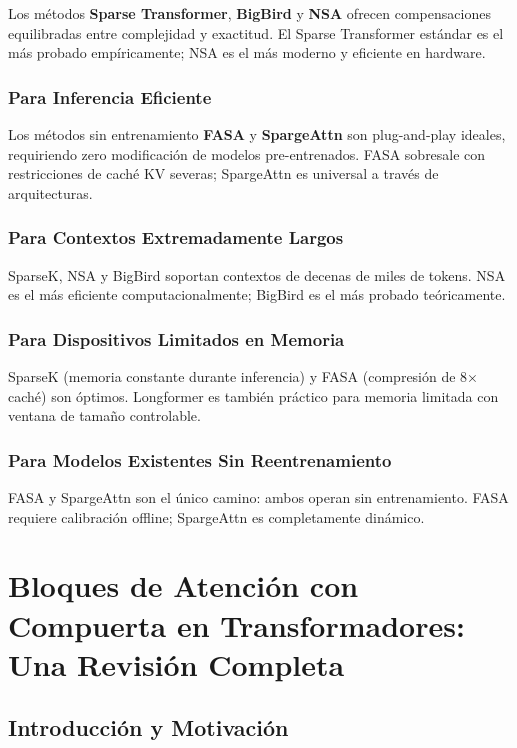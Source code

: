 \documentclass[11pt,a4paper]{article}
\begin{document}
Los métodos \textbf{Sparse Transformer}, \textbf{BigBird} y \textbf{NSA} ofrecen compensaciones equilibradas entre complejidad y exactitud. El Sparse Transformer estándar es el más probado empíricamente; NSA es el más moderno y eficiente en hardware.

\subsubsection{Para Inferencia Eficiente}

Los métodos sin entrenamiento \textbf{FASA} y \textbf{SpargeAttn} son plug-and-play ideales, requiriendo zero modificación de modelos pre-entrenados. FASA sobresale con restricciones de caché KV severas; SpargeAttn es universal a través de arquitecturas.

\subsubsection{Para Contextos Extremadamente Largos}

SparseK, NSA y BigBird soportan contextos de decenas de miles de tokens. NSA es el más eficiente computacionalmente; BigBird es el más probado teóricamente.

\subsubsection{Para Dispositivos Limitados en Memoria}

SparseK (memoria constante durante inferencia) y FASA (compresión de 8× caché) son óptimos. Longformer es también práctico para memoria limitada con ventana de tamaño controlable.

\subsubsection{Para Modelos Existentes Sin Reentrenamiento}

FASA y SpargeAttn son el único camino: ambos operan sin entrenamiento. FASA requiere calibración offline; SpargeAttn es completamente dinámico.

\appendix

\section{Bloques de Atención con Compuerta en Transformadores: Una Revisión Completa} \label{sec:gated_attention_blocks}

\subsection{Introducción y Motivación}
\end{document}
